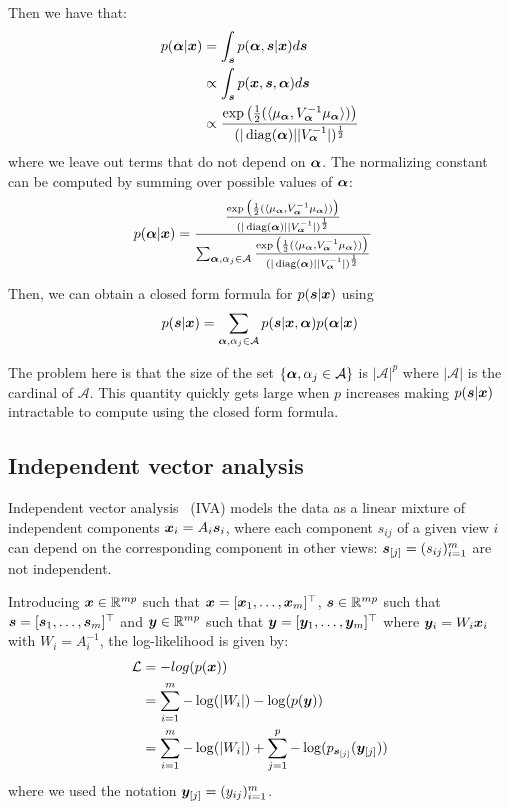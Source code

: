 Then we have that:
\begin{align}
  p(\boldsymbol{\alpha} | \boldsymbol{x}) &= \int_{\boldsymbol{s}} p(\boldsymbol{\alpha}, \boldsymbol{s} | \boldsymbol{x}) d\boldsymbol{s} \\
                    &\propto \int_{\boldsymbol{s}} p(\boldsymbol{x}, \boldsymbol{s} ,\boldsymbol{\alpha}) d\boldsymbol{s} \\ 
                   &\propto \frac{\exp\big(\frac12(\langle \mu_{\boldsymbol{\alpha}} ,V_{\boldsymbol{\alpha}}^{-1} \mu_{\boldsymbol{\alpha}} \rangle) \big)}{(|\operatorname*{diag}(\boldsymbol{\alpha})| |V_{\boldsymbol{\alpha}}^{-1}|)^{\frac12}}\\ 
\end{align}
where we leave out terms that do not depend on $\boldsymbol{\alpha}$.
The normalizing constant can be computed by summing over possible values of
$\boldsymbol{\alpha}$:
\begin{align}
  p(\boldsymbol{\alpha} | \boldsymbol{x}) &= \frac{\frac{\exp\big(\frac12(\langle \mu_{\boldsymbol{\alpha}} ,V_{\boldsymbol{\alpha}}^{-1} \mu_{\boldsymbol{\alpha}} \rangle) \big)}{(|\operatorname*{diag}(\boldsymbol{\alpha})| |V_{\boldsymbol{\alpha}}^{-1}|)^{\frac12}}}{\sum_{\boldsymbol{\alpha}, \alpha_j \in \mathcal{A}} \frac{\exp\big(\frac12(\langle \mu_{\boldsymbol{\alpha}} ,V_{\boldsymbol{\alpha}}^{-1} \mu_{\boldsymbol{\alpha}} \rangle) \big)}{(|\operatorname*{diag}(\boldsymbol{\alpha})| |V_{\boldsymbol{\alpha}}^{-1}|)^{\frac12}}}
\end{align}

Then, we can obtain a closed form formula for $p(\boldsymbol{s} | \boldsymbol{x})$ using
\begin{align}
  p(\boldsymbol{s} | \boldsymbol{x}) = \sum_{\boldsymbol{\alpha}, \alpha_j \in \mathcal{A}} p(\boldsymbol{s} | \boldsymbol{x}, \boldsymbol{\alpha}) p(\boldsymbol{\alpha} | \boldsymbol{x})
\end{align}

The problem here is that the size of the set $\{\boldsymbol{\alpha}, \alpha_j \in
\mathcal{A} \}$ is $|\mathcal{A}|^p$ where $|\mathcal{A}|$ is the cardinal of
$\mathcal{A}$. This quantity quickly gets large when $p$ increases making
$p(\boldsymbol{s} | \boldsymbol{x})$ intractable to compute using the closed form formula.

\subsection{Independent vector analysis}
\label{sec:IVA}
Independent vector analysis~\cite{lee2008independent} (IVA) models the data as a
linear mixture of independent components $\boldsymbol{x}_i = A_i \boldsymbol{s}_i$, where each
component $s_{ij}$ of a given view $i$ can depend on the corresponding component
in other views: $\boldsymbol{s}_{[j]} = (s_{ij})_{i=1}^m$ are not independent.

Introducing $\boldsymbol{x} \in \mathbb{R}^{mp}$ such that $\boldsymbol{x}  = [\boldsymbol{x}_1, \dots, \boldsymbol{x}_m]^{\top}$,
$\boldsymbol{s} \in \mathbb{R}^{mp}$ such that $\boldsymbol{s} = [\boldsymbol{s}_1, \dots, \boldsymbol{s}_m]^{\top}$ and $\boldsymbol{y}
\in \mathbb{R}^{mp}$ such that $\boldsymbol{y} = [\boldsymbol{y}_1, \dots, \boldsymbol{y}_m]^{\top}$ where $\boldsymbol{y}_i = W_i
\boldsymbol{x}_i$ with $W_i = A_i^{-1}$, the
log-likelihood is given by:
\begin{align*}
  \mathcal{L} &= - log(p(\boldsymbol{x})) \\
        &= \sum_{i=1}^m -\log(|W_i|) -\log(p(\boldsymbol{y})) \\
        &= \sum_{i=1}^m - \log(|W_i|) + \sum_{j=1}^p -\log(p_{\boldsymbol{s}_{[j]}}(\boldsymbol{y}_{[j]}))
\end{align*}
where we used the notation $\boldsymbol{y}_{[j]} = (y_{ij})_{i=1}^m$.


